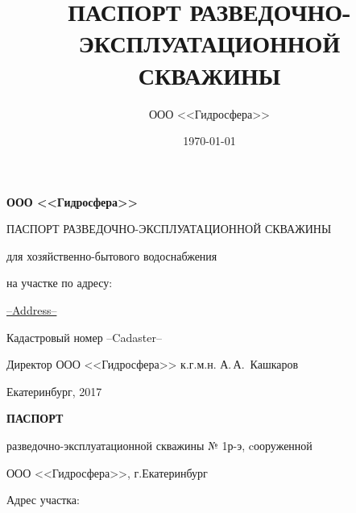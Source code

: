 \documentclass[a4paper,12pt]{article} %
\author{ООО <<Гидросфера>>}\label{company}
\title{ПАСПОРТ РАЗВЕДОЧНО-ЭКСПЛУАТАЦИОННОЙ СКВАЖИНЫ}
\date{\today}
\newcommand{\txtExecutor}{ООО <<Гидросфера>>}	%
\newcommand{\txtYear}{2017}						%
\newcommand{\txtNumber}{№ 1р-э}  				%
\newcommand{\txtAddress}{--Address--}
\newcommand{\txtCadaster}{--Cadaster--} 		%
\begin{document}


\begin{titlepage}
	\begin{center}
		\textbf{\txtExecutor}
		\vspace{5.5cm}
		
		{\LARGE ПАСПОРТ РАЗВЕДОЧНО-ЭКСПЛУАТАЦИОННОЙ СКВАЖИНЫ}
		\vspace{0.25cm}
		
		для хозяйственно-бытового водоснабжения
		
		\bigskip
		
		на участке по адресу:
				
		\underline{\txtAddress}
		
		\bigskip
		Кадастровый номер \txtCadaster
		
		\vfill
	
		\bigskip
		
	\end{center}

	\vfill
	
	\newlength{\ML}
	\hfill
	\begin{minipage}{1.0\textwidth}
		Директор ООО <<Гидросфера>> к.г.м.н.
		\underline{\hspace{\ML}} А.\,А.~Кашкаров\\
	\end{minipage}%
	
	\bigskip
	
	\vfill
	\begin{center}
		Екатеринбург, \txtYear
	\end{center}			

	\end{titlepage}


	\begin{center}
		\textbf{ПАСПОРТ}

		разведочно-эксплуатационной скважины \txtNumber, cооруженной 

		\txtExecutor, г.Екатеринбург

	\end{center}


	\bigskip
	
	Адрес участка: 
\end{document}
